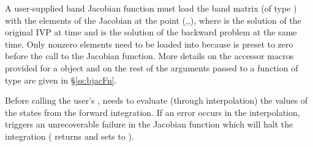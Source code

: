 {
  A user-supplied band Jacobian function must load the band matrix 
  (of type ) with the elements of the Jacobian at the
  point (,,), where  is the solution
  of the original IVP at time  and  is the solution of the
  backward problem at the same time.  
  Only nonzero elements need to be loaded into
   because  is preset to zero before the call to the
  Jacobian function. More details on the accessor macros provided for
  a  object and on the rest of the arguments passed to a function
  of type  are given in \S\ref{ss:bjacFn}.

  {\warn}Before calling the user's , {\idas} needs to evaluate
  (through interpolation) the values of the states from the forward integration. 
  If an error occurs in the interpolation, {\idas} triggers an unrecoverable
  failure in the Jacobian function which will halt the integration
  ( returns  and {\idaband} sets  to
  ).
}

